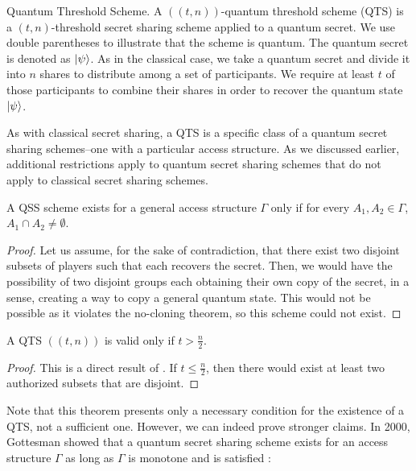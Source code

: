 \begin{definition}{Quantum Threshold Scheme.}
    \label{defn:qts}
    A $((t,n))$-quantum threshold scheme (QTS) is a $(t,n)$-threshold secret sharing scheme applied to a quantum secret. We use double parentheses to illustrate that the scheme is quantum. The quantum secret is denoted as $\ket{\psi}$. As in the classical case, we take a quantum secret and divide it into $n$ shares to distribute among a set of participants. We require at least $t$ of those participants to combine their shares in order to recover the quantum state $\ket{\psi}$.
\end{definition}

As with classical secret sharing, a QTS is a specific class of a quantum secret sharing schemes--one with a particular access structure. As we discussed earlier, additional restrictions apply to quantum secret sharing schemes that do not apply to classical secret sharing schemes.

\begin{theorem}
    \label{thm:qss-disjoint}
    A QSS scheme exists for a general access structure $\Gamma$ only if for every $A_1, A_2 \in \Gamma$, $A_1 \cap A_2 \neq \emptyset$.
\end{theorem}

\begin{proof}
    Let us assume, for the sake of contradiction, that there exist two disjoint subsets of players such that each recovers the secret. Then, we would have the possibility of two disjoint groups each obtaining their own copy of the secret, in a sense, creating a way to copy a general quantum state. This would not be possible as it violates the no-cloning theorem, so this scheme could not exist.
\end{proof}

\begin{corollary}
    \label{cor:qts}
    A QTS $((t,n))$ is valid only if $t > \frac{n}{2}$.
\end{corollary}

\begin{proof}
    This is a direct result of . If $t \leq \frac{n}{2}$, then there would exist at least two authorized subsets that are disjoint. 
\end{proof}

Note that this theorem presents only a necessary condition for the existence of a QTS, not a sufficient one. However, we can indeed prove stronger claims. In 2000, Gottesman showed that a quantum secret sharing scheme exists for an access structure $\Gamma$ as long as $\Gamma$ is monotone and  is satisfied \cite{gottesman_theory_2000}:

